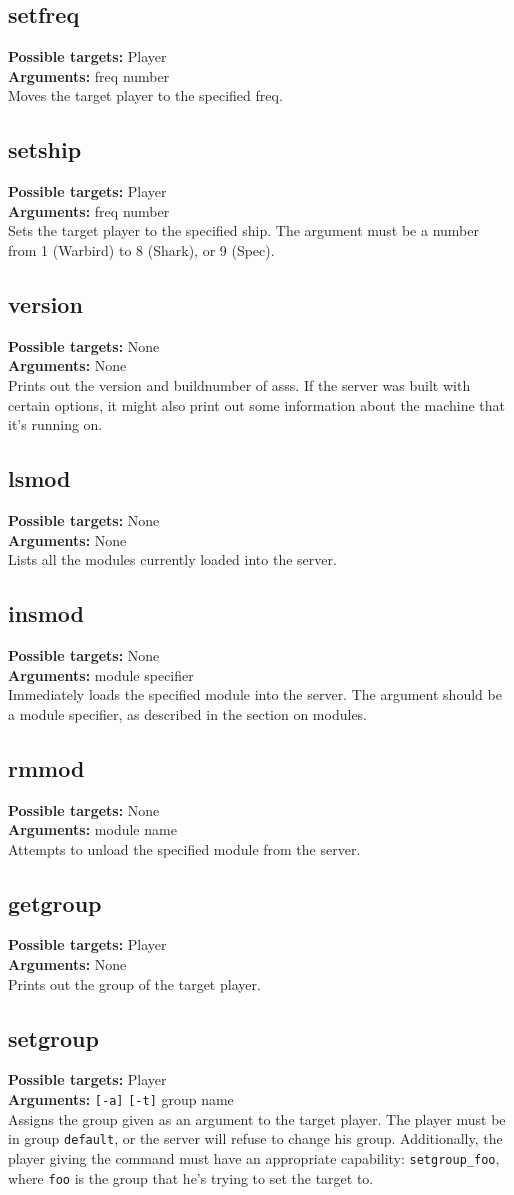 \documentclass{article}
\newcommand{\targets}[1]{\noindent\textbf{Possible targets:} #1\\}
\newcommand{\args}[1]{\noindent\textbf{Arguments:} #1\\}
\begin{document}
\subsection{setfreq}
\targets{Player}
\args{freq number}
Moves the target player to the specified freq.

\subsection{setship}
\targets{Player}
\args{freq number}
Sets the target player to the specified ship. The argument must be a
number from 1 (Warbird) to 8 (Shark), or 9 (Spec).

\subsection{version}
\targets{None}
\args{None}
Prints out the version and buildnumber of asss. If the server was built
with certain options, it might also print out some information about the
machine that it's running on.

\subsection{lsmod}
\targets{None}
\args{None}
Lists all the modules currently loaded into the server.

\subsection{insmod}
\targets{None}
\args{module specifier}
Immediately loads the specified module into the server. The argument
should be a module specifier, as described in the section on modules.

\subsection{rmmod}
\targets{None}
\args{module name}
Attempts to unload the specified module from the server.

\subsection{getgroup}
\targets{Player}
\args{None}
Prints out the group of the target player.

\subsection{setgroup}
\targets{Player}
\args{\texttt{[-a]} \texttt{[-t]} group name}
Assigns the group given as an argument to the target player. The player
must be in group \verb/default/, or the server will refuse to change his
group. Additionally, the player giving the command must have an
appropriate capability: \verb/setgroup_foo/, where \verb/foo/ is the
group that he's trying to set the target to.
\end{document}
